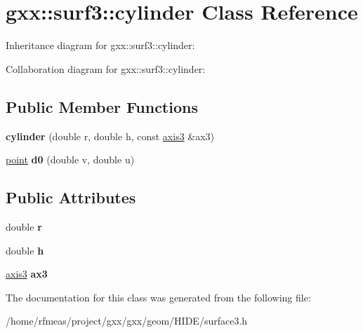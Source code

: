 \hypertarget{classgxx_1_1surf3_1_1cylinder}{}\section{gxx\+:\+:surf3\+:\+:cylinder Class Reference}
\label{classgxx_1_1surf3_1_1cylinder}


Inheritance diagram for gxx\+:\+:surf3\+:\+:cylinder\+:


Collaboration diagram for gxx\+:\+:surf3\+:\+:cylinder\+:
\subsection*{Public Member Functions}
\begin{DoxyCompactItemize}
\item 
{\bfseries cylinder} (double r, double h, const \hyperlink{classgxx_1_1geom3_1_1axis3}{axis3} \&ax3)\hypertarget{classgxx_1_1surf3_1_1cylinder_a02c9f02f2d8be5aa7f3ca76253ca56a4}{}\label{classgxx_1_1surf3_1_1cylinder_a02c9f02f2d8be5aa7f3ca76253ca56a4}

\item 
\hyperlink{classgxx_1_1geom3_1_1point}{point} {\bfseries d0} (double v, double u)\hypertarget{classgxx_1_1surf3_1_1cylinder_a13d335090c4f2b1ef2d9d60211c0cf18}{}\label{classgxx_1_1surf3_1_1cylinder_a13d335090c4f2b1ef2d9d60211c0cf18}

\end{DoxyCompactItemize}
\subsection*{Public Attributes}
\begin{DoxyCompactItemize}
\item 
double {\bfseries r}\hypertarget{classgxx_1_1surf3_1_1cylinder_a40aebd97a8cb51a8c50a02af2efeeb86}{}\label{classgxx_1_1surf3_1_1cylinder_a40aebd97a8cb51a8c50a02af2efeeb86}

\item 
double {\bfseries h}\hypertarget{classgxx_1_1surf3_1_1cylinder_a6677c0364f298c08e540a58271bc2e85}{}\label{classgxx_1_1surf3_1_1cylinder_a6677c0364f298c08e540a58271bc2e85}

\item 
\hyperlink{classgxx_1_1geom3_1_1axis3}{axis3} {\bfseries ax3}\hypertarget{classgxx_1_1surf3_1_1cylinder_a92862bc9927fdfe31d3b315c9f89d66a}{}\label{classgxx_1_1surf3_1_1cylinder_a92862bc9927fdfe31d3b315c9f89d66a}

\end{DoxyCompactItemize}


The documentation for this class was generated from the following file\+:\begin{DoxyCompactItemize}
\item 
/home/rfmeas/project/gxx/gxx/geom/\+H\+I\+D\+E/surface3.\+h\end{DoxyCompactItemize}
